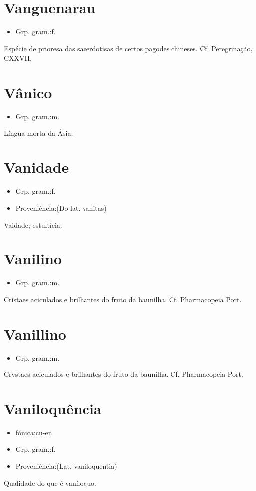 \documentclass{article}
\begin{document}
\section{Vanguenarau}
\begin{itemize}
\item {Grp. gram.:f.}
\end{itemize}
Espécie de prioresa das sacerdotisas de certos pagodes chineses. Cf. \textunderscore Peregrinação\textunderscore , CXXVII.
\section{Vânico}
\begin{itemize}
\item {Grp. gram.:m.}
\end{itemize}
Língua morta da Ásia.
\section{Vanidade}
\begin{itemize}
\item {Grp. gram.:f.}
\end{itemize}
\begin{itemize}
\item {Proveniência:(Do lat. \textunderscore vanitas\textunderscore )}
\end{itemize}
Vaidade; estultícia.
\section{Vanilino}
\begin{itemize}
\item {Grp. gram.:m.}
\end{itemize}
Cristaes aciculados e brilhantes do fruto da baunilha. Cf. \textunderscore Pharmacopeia Port.\textunderscore 
\section{Vanillino}
\begin{itemize}
\item {Grp. gram.:m.}
\end{itemize}
Crystaes aciculados e brilhantes do fruto da baunilha. Cf. \textunderscore Pharmacopeia Port.\textunderscore 
\section{Vaniloquência}
\begin{itemize}
\item {fónica:cu-en}
\end{itemize}
\begin{itemize}
\item {Grp. gram.:f.}
\end{itemize}
\begin{itemize}
\item {Proveniência:(Lat. \textunderscore vaniloquentia\textunderscore )}
\end{itemize}
Qualidade do que é vaníloquo.
\end{document}
